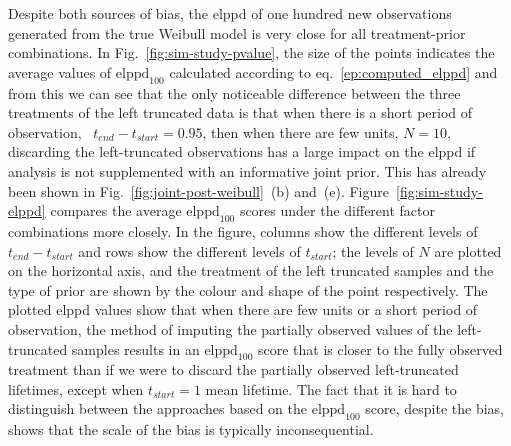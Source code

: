 Despite both sources of bias, the elppd of one hundred new observations generated from the true Weibull model is very close for all treatment-prior combinations. In Fig.~\ref{fig:sim-study-pvalue}, the size of the points indicates the average values of $\text{elppd}_{100}$ calculated according to eq.~\eqref{ep:computed_elppd} and from this we can see that the only noticeable difference between the three treatments of the left truncated data is that when there is a short period of observation,  $t_{end} - t_{start} = 0.95$, then when there are few units, $N = 10$, discarding the left-truncated observations has a large impact on the elppd if analysis is not supplemented with an informative joint prior. This has already been shown in Fig.~\ref{fig:joint-post-weibull}~(b) and~(e). Figure~\ref{fig:sim-study-elppd} compares the average $\text{elppd}_{100}$ scores under the different factor combinations more closely. In the figure, columns show the different levels of $t_{end} - t_{start}$ and rows show the different levels of $t_{start}$; the levels of $N$ are plotted on the horizontal axis, and the treatment of the left truncated samples and the type of prior are shown by the colour and shape of the point respectively. The plotted elppd values show that when there are few units or a short period of observation, the method of imputing the partially observed values of the left-truncated samples results in an $\text{elppd}_{100}$ score that is closer to the fully observed treatment than if we were to discard the partially observed left-truncated lifetimes, except when $t_{start} = 1$ mean lifetime. The fact that it is hard to distinguish between the approaches based on the $\text{elppd}_{100}$ score, despite the bias, shows that the scale of the bias is typically inconsequential.

